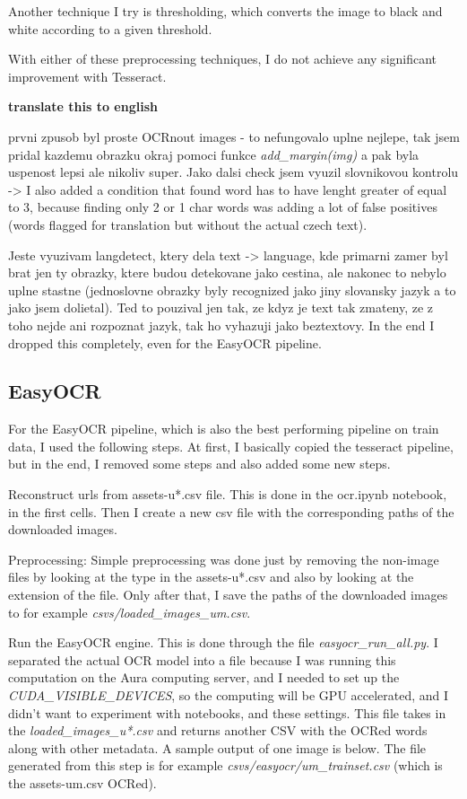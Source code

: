 \documentclass[
  digital,     %
  oneside,     %
  nosansbold,  %
  nocolorbold, %
  nolof,         %
  nolot,         %
]{fithesis4}
\begin{document}
Another technique I try is thresholding, which converts the image to black and white according to a given threshold.

With either of these preprocessing techniques, I do not achieve any significant improvement with Tesseract.

\textbf{translate this to english}

prvni zpusob byl proste OCRnout images - to nefungovalo uplne nejlepe, tak jsem pridal kazdemu obrazku okraj pomoci funkce \emph{add\_margin(img)} a pak byla uspenost lepsi ale nikoliv super. Jako dalsi check jsem vyuzil slovnikovou kontrolu -> I also added a condition that found word has to have lenght greater of equal to 3, because finding only 2 or 1 char words was adding a lot of false positives (words flagged for translation but without the actual czech text).

Jeste vyuzivam langdetect, ktery dela text -> language, kde primarni zamer byl brat jen ty obrazky, ktere budou detekovane jako cestina, ale nakonec to nebylo uplne stastne (jednoslovne obrazky byly recognized jako jiny slovansky jazyk a to jako jsem dolietal). Ted to pouzival jen tak, ze kdyz je text tak zmateny, ze z toho nejde ani rozpoznat jazyk, tak ho vyhazuji jako beztextovy. In the end I dropped this completely, even for the EasyOCR pipeline.

\subsection{EasyOCR}

For the EasyOCR pipeline, which is also the best performing pipeline on train data, I used the following steps. At first, I basically copied the tesseract pipeline, but in the end, I removed some steps and also added some new steps.

Reconstruct urls from assets-u*.csv file. This is done in the ocr.ipynb notebook, in the first cells. Then I create a new csv file with the corresponding paths of the downloaded images.

Preprocessing: Simple preprocessing was done just by removing the non-image files by looking at the type in the assets-u*.csv and also by looking at the extension of the file. Only after that, I save the paths of the downloaded images to for example \emph{csvs/loaded\_images\_um.csv}.

Run the EasyOCR engine. This is done through the file \emph{easyocr\_run\_all.py}. I separated the actual OCR model into a file because I was running this computation on the Aura computing server, and I needed to set up the \emph{CUDA\_VISIBLE\_DEVICES}, so the computing will be GPU accelerated, and I didn't want to experiment with notebooks, and these settings. This file takes in the \emph{loaded\_images\_u*.csv} and returns another CSV with the OCRed words along with other metadata. A sample output of one image is below. The file generated from this step is for example \emph{csvs/easyocr/um\_trainset.csv} (which is the assets-um.csv OCRed).
\end{document}
